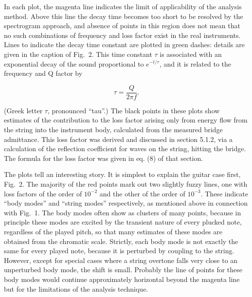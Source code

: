   In each plot, the magenta line indicates the limit of applicability of the 
  analysis method. Above this line the decay time becomes too short to be 
  resolved by the spectrogram approach, and absence of points in this region 
  does not mean that no such combinations of frequency and loss factor exist in 
  the real instruments. Lines to indicate the decay time constant are plotted 
  in green dashes: details are given in the caption of Fig.\ 2. This time 
  constant $\tau$ is associated with an exponential decay of the sound 
  proportional to $e^{-t/\tau}$, and it is related to the frequency and Q 
  factor by 

  $$\tau=\frac{Q}{2 \pi f} . \tag{1}$$ 

  (Greek letter $\tau$, pronounced ``tau''.) The black points in these plots 
  show estimates of the contribution to the loss factor arising only from 
  energy flow from the string into the instrument body, calculated from the 
  measured bridge admittance. This loss factor was derived and discussed in 
  section 5.1.2, via a calculation of the reflection coefficient for waves on 
  the string, hitting the bridge. The formula for the loss factor was given in 
  eq. (8) of that section. 

  The plots tell an interesting story. It is simplest to explain the guitar 
  case first, Fig.\ 2. The majority of the red points mark out two slightly 
  fuzzy lines, one with loss factors of the order of $10^{-2}$ and the other of 
  the order of $10^{-3}$. These indicate ``body modes'' and ``string modes'' 
  respectively, as mentioned above in connection with Fig.\ 1. The body modes 
  often show as clusters of many points, because in principle these modes are 
  excited by the transient nature of every plucked note, regardless of the 
  played pitch, so that many estimates of these modes are obtained from the 
  chromatic scale. Strictly, each body mode is not exactly the same for every 
  played note, because it is perturbed by coupling to the string. However, 
  except for special cases where a string overtone falls very close to an 
  unperturbed body mode, the shift is small. Probably the line of points for 
  these body modes would continue approximately horizontal beyond the magenta 
  line but for the limitations of the analysis technique. 

